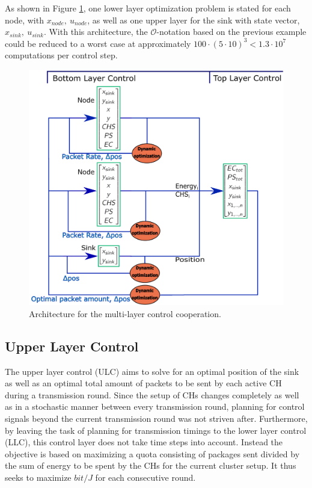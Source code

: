 \noindent As shown in Figure \ref{fig:splitctrl}, one lower layer optimization problem is stated for each node, with $x_{node},\:u_{node}$, as well as one upper layer for the sink with state vector, $x_{sink}, \: u_{sink}$. With this architecture, the $\mathcal{O}$-notation based on the previous example could be reduced to a worst case at approximately $100\cdot(5\cdot10)^{3}<1.3\cdot10^{7}$ computations per control step. 
\begin{figure}
    \centering
    \includegraphics[scale = 0.4]{Images/splitcontrol.png}
    \caption{Architecture for the multi-layer control cooperation.}
    \label{fig:splitctrl}
\end{figure}
\subsection{Upper Layer Control}
\noindent The upper layer control (ULC) aims to solve for an optimal position of the sink as well as an optimal total amount of packets to be sent by each active CH during a transmission round. Since the setup of CHs changes completely as well as in a stochastic manner between every transmission round, planning for control signals beyond the current transmission round was not striven after. Furthermore, by leaving the task of planning for transmission timings to the lower layer control (LLC), this control layer does not take time steps into account. Instead the objective is based on maximizing a quota consisting of packages sent divided by the sum of energy to be spent by the CHs for the current cluster setup. It thus seeks to maximize $bit/J$ for each consecutive round.  \newline

